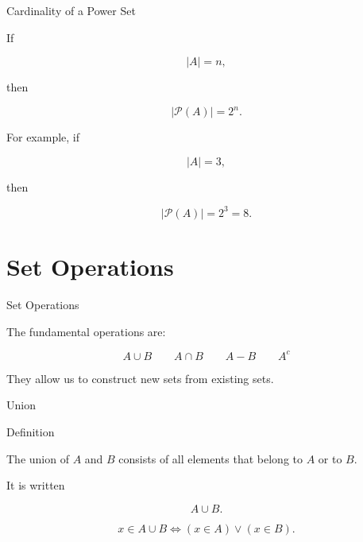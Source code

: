 \documentclass[aspectratio=169,11pt]{beamer}
\begin{document}
\begin{frame}{Cardinality of a Power Set}

If

\[
|A|=n,
\]

then

\[
\boxed{
|\mathcal P(A)|=2^n.
}
\]

\vspace{0.35cm}

For example, if

\[
|A|=3,
\]

then

\[
|\mathcal P(A)|=2^3=8.
\]

\end{frame}


\section{Set Operations}


\begin{frame}{Set Operations}

The fundamental operations are:

\begin{center}

\[
A\cup B
\qquad
A\cap B
\qquad
A-B
\qquad
A^c
\]

\end{center}

\vspace{0.35cm}

They allow us to construct new sets from existing sets.

\end{frame}


\begin{frame}{Union}

\begin{block}{Definition}

The union of $A$ and $B$ consists of all elements that
belong to $A$ or to $B$.

\end{block}

\vspace{0.35cm}

It is written

\[
\boxed{A\cup B}.
\]

\vspace{0.3cm}

\[
x\in A\cup B
\iff
(x\in A)\lor(x\in B).
\]

\end{frame}
\end{document}
